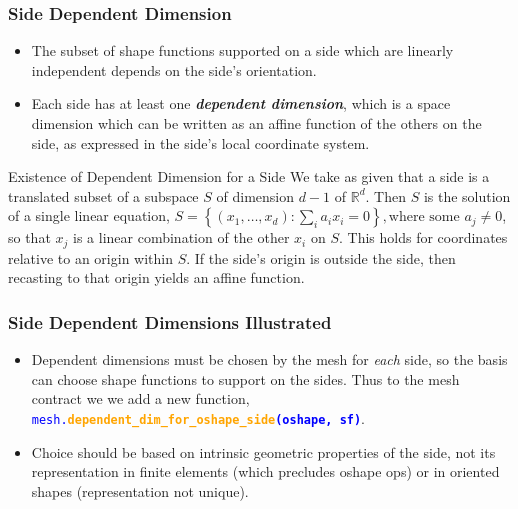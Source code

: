 \documentclass[compress]{beamer}
\begin{document}
\begin{frame}
  \frametitle{Side Dependent Dimension}
  \begin{itemize}[<+->]
  \item The subset of shape functions supported on a side which are linearly independent depends on the side's orientation.
  \item Each side has at least one \emph{\textbf{dependent dimension}}, which is a space dimension which can be written as an affine
      function of the others on the side, as expressed in the side's local coordinate system.
  \end{itemize}
  \uncover<+-> {
    \begin{block}{Existence of Dependent Dimension for a Side}
      We take as given that a side is a translated subset of a subspace $S$ of dimension $d-1$ of $\mathbb{R}^d$. Then $S$ is the solution
      of a single linear equation, $S = \left\{(x_1,\dots,x_d): \sum_{i} a_i x_i = 0\right\}, \text{where some } a_j \ne 0$,
        so that $x_j$ is a linear combination of the other $x_i$ on $S$. This holds for coordinates relative to an origin within $S$.
        If the side's origin is outside the side, then recasting to that origin yields an affine function.
    \end{block}
  }
\end{frame}

\begin{frame}
  \frametitle{Side Dependent Dimensions Illustrated}
    \begin{itemize}[<+->]
      \item Dependent dimensions must be chosen by the mesh for \emph{each} side, so the basis can choose shape functions to support on the sides.
        Thus to the mesh contract we we add a new function,
        {\small \texttt{\textcolor{blue}{mesh.\textbf{\textcolor{orange}{dependent\_dim\_for\_oshape\_side}(oshape, sf)}}}}.
      \item Choice should be based on intrinsic geometric properties of the side, not its representation in finite elements
        (which precludes oshape ops) or in oriented shapes (representation not unique).
    \end{itemize}
\end{frame}
\end{document}

